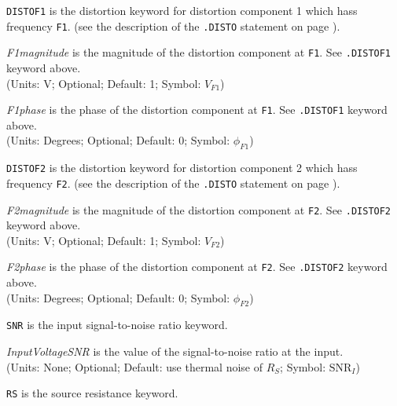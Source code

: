\begin{widelist}
\item[{\tt DISTOF1}] is the distortion keyword for distortion component 1
              which hass frequency {\tt F1}.
              (see  the  description  of  the {\tt .DISTO}  statement on
              page \pageref{.DISTOstatement}).

\item[{\it F1magnitude}] is the magnitude of the distortion component at
              {\tt F1}. See {\tt .DISTOF1} keyword above.\\
               (Units: V; Optional; Default: 1; Symbol: $V_{F1}$)

\item[{\it F1phase}] is the phase of the distortion component at
              {\tt F1}. See {\tt .DISTOF1} keyword above.\\
               (Units: Degrees; Optional; Default: 0; Symbol: $\phi_{F1}$)


\item[{\tt DISTOF2}] is the distortion keyword for distortion component 2
              which hass frequency {\tt F2}.
              (see  the  description  of  the {\tt .DISTO}  statement on
              page \pageref{.DISTOstatement}).

\item[{\it F2magnitude}] is the magnitude of the distortion component at
              {\tt F2}. See {\tt .DISTOF2} keyword above.\\
               (Units: V; Optional; Default: 1; Symbol: $V_{F2}$)

\item[{\it F2phase}] is the phase of the distortion component at
              {\tt F2}. See {\tt .DISTOF2} keyword above.\\
               (Units: Degrees; Optional; Default: 0; Symbol: $\phi_{F2}$)

\item[{\tt SNR}] is the input signal-to-noise ratio keyword. \sspice

\item[{\it InputVoltageSNR}] is the value of the signal-to-noise ratio at the
               input.\\
               (Units: None; Optional; Default: use thermal noise of $R_S$;
                Symbol: $\mbox{SNR}_I$)  \sspice

\item[{\tt RS}] is the source resistance keyword.  \sspice


\end{widelist}
